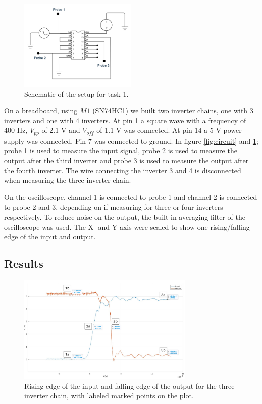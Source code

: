 \documentclass[onecolumn]{article}
\begin{document}
\begin{figure}[h!]
    \centering
    \includegraphics[width=0.5\textwidth]{circuit_schematics.png}
    \caption{Schematic of the setup for task 1.}
    \label{fig:schematic}
\end{figure}

On a breadboard, using $M1$ (SN74HC1) we built two inverter chains, one with 3 inverters and one with 4 inverters. At pin 1 a square wave with a frequency of 400 Hz, $V_{pp}$ of 2.1 V and $V_{off}$ of 1.1 V was connected. At pin 14 a 5 V power supply was connected. Pin 7 was connected to ground. In figure \ref{fig:circuit} and \ref{fig:schematic}; probe 1 is used to measure the input signal, probe 2 is used to measure the output after the third inverter and probe 3 is used to measure the output after the fourth inverter. The wire connecting the inverter 3 and 4 is disconnected when measuring the three inverter chain.

On the oscilloscope, channel 1 is connected to probe 1 and channel 2 is connected to probe 2 and 3, depending on if measuring for three or four inverters respectively. To reduce noise on the output, the built-in averaging filter of the oscilloscope was used. The X- and Y-axis were scaled to show one rising/falling edge of the input and output.

\clearpage

\subsection{Results}

\begin{figure}[h!]
    \centering
    \includegraphics[width=0.75\textwidth]{3_inverters_marked.png}
    \caption{Rising edge of the input and falling edge of the output for the three inverter chain, with labeled marked points on the plot.}
    \label{fig:3inv}
\end{figure}
\end{document}
